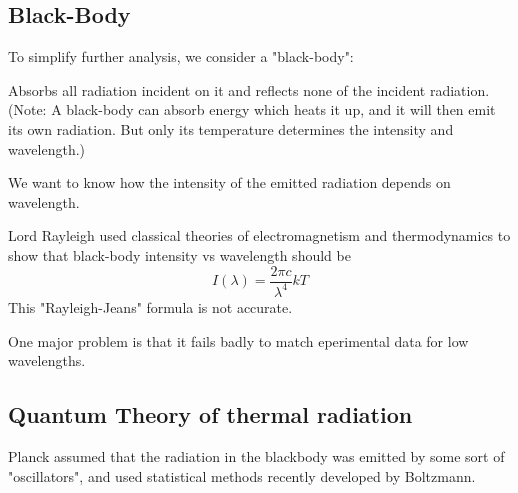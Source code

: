 \documentclass[class=article,crop=false]{standalone}
\begin{document}
\subsection{Black-Body}
To simplify further analysis, we consider a "black-body":\\
\begin{result}
	Absorbs all radiation incident on it and reflects none of the incident radiation. \\
	(Note: A black-body can absorb energy which heats it up, and it will then emit its own radiation. But only its temperature determines the intensity and wavelength.)
\end{result}

We want to know how the intensity of the emitted radiation depends on wavelength.

\begin{result}
	Lord Rayleigh used classical theories of electromagnetism and thermodynamics to show that black-body intensity vs wavelength should be
	$$ I(\lambda) = \frac{2\pi c}{\lambda^4} kT $$
	This "Rayleigh-Jeans" formula is not accurate.
\end{result}
One major problem is that it fails badly to match eperimental data for low wavelengths.

\subsection{Quantum Theory of thermal radiation}

Planck assumed that the radiation in the blackbody was emitted by some sort of "oscillators", and used statistical methods recently developed by Boltzmann.
\end{document}
